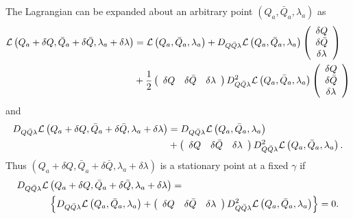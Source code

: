 \documentclass[aps,preprint]{revtex4}%
\begin{document}
The Lagrangian can be expanded about an arbitrary point $\left(  Q_{a},\bar
{Q}_{a},\lambda_{a}\right)  $ as
\begin{align}
\mathcal{L}\left(  Q_{a}+\delta Q,\bar{Q}_{a}+\delta\bar{Q},\lambda_{a}%
+\delta\lambda\right)   &  =\mathcal{L}\left(  Q_{a},\bar{Q}_{a},\lambda
_{a}\right)  +D_{Q\bar{Q}\lambda}\mathcal{L}\left(  Q_{a},\bar{Q}_{a}%
,\lambda_{a}\right)  \left(
\begin{array}
[c]{c}%
\delta Q\\
\delta\bar{Q}\\
\delta\lambda
\end{array}
\right) \nonumber\\
&  +\frac{1}{2}\left(
\begin{array}
[c]{ccc}%
\delta Q & \delta\bar{Q} & \delta\lambda
\end{array}
\right)  D_{Q\bar{Q}\lambda}^{2}\mathcal{L}\left(  Q_{a},\bar{Q}_{a}%
,\lambda_{a}\right)  \left(
\begin{array}
[c]{c}%
\delta Q\\
\delta\bar{Q}\\
\delta\lambda
\end{array}
\right)
\end{align}
and
\begin{align}
D_{Q\bar{Q}\lambda}\mathcal{L}\left(  Q_{a}+\delta Q,\bar{Q}_{a}+\delta\bar
{Q},\lambda_{a}+\delta\lambda\right)   &  =D_{Q\bar{Q}\lambda}\mathcal{L}%
\left(  Q_{a},\bar{Q}_{a},\lambda_{a}\right) \\
&  +\left(
\begin{array}
[c]{ccc}%
\delta Q & \delta\bar{Q} & \delta\lambda
\end{array}
\right)  D_{Q\bar{Q}\lambda}^{2}\mathcal{L}\left(  Q_{a},\bar{Q}_{a}%
,\lambda_{a}\right)  .
\end{align}
Thus $\left(  Q_{a}+\delta Q,\bar{Q}_{a}+\delta\bar{Q},\lambda_{a}%
+\delta\lambda\right)  $ is a stationary point at a fixed $\gamma$ if
\begin{align}
D_{Q\bar{Q}\lambda}\mathcal{L}  &  \left(  Q_{a}+\delta Q,\bar{Q}_{a}%
+\delta\bar{Q},\lambda_{a}+\delta\lambda\right)  =\label{NR}\\
&  \left\{  D_{Q\bar{Q}\lambda}\mathcal{L}\left(  Q_{a},\bar{Q}_{a}%
,\lambda_{a}\right)  +\left(
\begin{array}
[c]{ccc}%
\delta Q & \delta\bar{Q} & \delta\lambda
\end{array}
\right)  D_{Q\bar{Q}\lambda}^{2}\mathcal{L}\left(  Q_{a},\bar{Q}_{a}%
,\lambda_{a}\right)  \right\}  =0.
\end{align}
\end{document}
